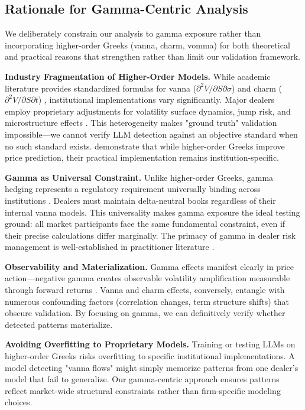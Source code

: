 \subsection{Rationale for Gamma-Centric Analysis}
\label{sec:gamma-focus-jv}

We deliberately constrain our analysis to gamma exposure rather than incorporating higher-order Greeks (vanna, charm, vomma) for both theoretical and practical reasons that strengthen rather than limit our validation framework.

\textbf{Industry Fragmentation of Higher-Order Models.} While academic literature provides standardized formulas for vanna ($\partial^2V/\partial S \partial \sigma$) and charm ($\partial^2V/\partial S \partial t$) \citep{ederington2007}, institutional implementations vary significantly. Major dealers employ proprietary adjustments for volatility surface dynamics, jump risk, and microstructure effects \citep{mixon2009}. This heterogeneity makes "ground truth" validation impossible—we cannot verify LLM detection against an objective standard when no such standard exists. \citet{ederington2007} demonstrate that while higher-order Greeks improve price prediction, their practical implementation remains institution-specific.

\textbf{Gamma as Universal Constraint.} Unlike higher-order Greeks, gamma hedging represents a regulatory requirement universally binding across institutions \citep{mixon2009}. Dealers must maintain delta-neutral books regardless of their internal vanna models. This universality makes gamma exposure the ideal testing ground: all market participants face the same fundamental constraint, even if their precise calculations differ marginally. The primacy of gamma in dealer risk management is well-established in practitioner literature \citep{pearson2013}.

\textbf{Observability and Materialization.} Gamma effects manifest clearly in price action—negative gamma creates observable volatility amplification measurable through forward returns \citep{ni2022}. Vanna and charm effects, conversely, entangle with numerous confounding factors (correlation changes, term structure shifts) that obscure validation. By focusing on gamma, we can definitively verify whether detected patterns materialize.

\textbf{Avoiding Overfitting to Proprietary Models.} Training or testing LLMs on higher-order Greeks risks overfitting to specific institutional implementations. A model detecting "vanna flows" might simply memorize patterns from one dealer's model that fail to generalize. Our gamma-centric approach ensures patterns reflect market-wide structural constraints rather than firm-specific modeling choices.

